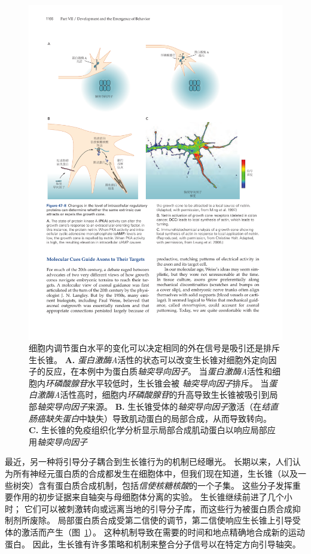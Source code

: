 \begin{figure}[htbp]
	\centering
	\includegraphics[width=1.0\linewidth]{chap47/fig_47_8}
	\caption{细胞内调节蛋白水平的变化可以决定相同的外在信号是吸引还是排斥生长锥。
		\textbf{A.} \textit{蛋白激酶A}活性的状态可以改变生长锥对细胞外定向因子的反应，在本例中为蛋白质\textit{轴突导向因子}。
		当\textit{蛋白激酶A}活性和细胞内\textit{环磷酸腺苷}水平较低时，生长锥会被 \textit{轴突导向因子}排斥。
		当\textit{蛋白激酶A}活性高时，细胞内\textit{环磷酸腺苷}的升高导致生长锥被吸引到局部\textit{轴突导向因子}来源\cite{ming1997camp}。
		\textbf{B.} 生长锥受体的\textit{轴突导向因子}激活（在\textit{结直肠癌缺失蛋白}中缺失）导致肌动蛋白的局部合成，从而导致转向。
		\textbf{C.} 生长锥的免疫组织化学分析显示局部合成肌动蛋白以响应局部应用\textit{轴突导向因子}\cite{leung2006asymmetrical} }
	\label{fig:47_8}
\end{figure}


最近，另一种将引导分子耦合到生长锥行为的机制已经曝光。
长期以来，人们认为所有神经元蛋白质的合成都发生在细胞体中，但我们现在知道，生长锥（以及一些树突）含有蛋白质合成机制，包括\textit{信使核糖核酸}的一个子集。
这些分子发挥重要作用的初步证据来自轴突与母细胞体分离的实验。
生长锥继续前进了几个小时； 它们可以被刺激转向或远离当地的引导分子库，而这些行为被蛋白质合成抑制剂所废除。
局部蛋白质合成受第二信使的调节，第二信使响应生长锥上引导受体的激活而产生（图~\ref{fig:47_8}）。
这种机制导致在需要的时间和地点精确地合成新的运动蛋白。
因此，生长锥有许多策略和机制来整合分子信号以在特定方向引导轴突。



